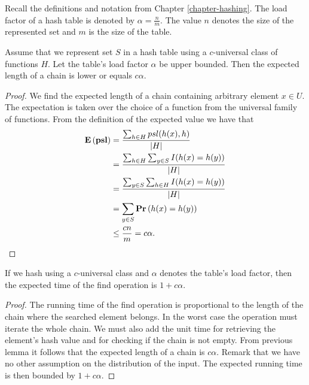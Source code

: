 Recall the definitions and notation from Chapter \ref{chapter-hashing}. The load factor of a hash table is denoted by $\alpha = \frac{n}{m}$. The value $n$ denotes the size of the represented set and $m$ is the size of the table.

\begin{theorem}
\label{theorem-expected-chain-length-universal}
Assume that we represent set $S$ in a hash table using a $c$-universal class of functions $H$. Let the table's load factor $\alpha$ be upper bounded. Then the expected length of a chain is lower or equals $c \alpha$.
\end{theorem}
\begin{proof}
We find the expected length of a chain containing arbitrary element $x \in U$. The expectation is taken over the choice of a function from the universal family of functions. From the definition of the expected value we have that
\begin{displaymath}
\begin{split}
\mathbf{E}\left(\mathbf{psl}\right) 
	& = \frac{\sum\displaylimits_{h \in H} psl(h(x), h) }{|H|} \\
	& = \frac{\sum\displaylimits_{h \in H} \sum\displaylimits_{y \in S} I(h(x) = h(y))}{|H|} \\
	& = \frac{\sum\displaylimits_{y \in S} \sum\displaylimits_{h \in H} I(h(x) = h(y))}{|H|}  \\
	& = \sum\displaylimits_{y \in S} \mathbf{Pr}\left(h(x) = h(y)\right) \\
	& \leq \frac{cn}{m} = c \alpha \text{.}
\end{split}
\end{displaymath}
\end{proof}

\begin{corollary}
If we hash using a $c$-universal class and $\alpha$ denotes the table's load factor, then the expected time of the find operation is $1 + c\alpha$.
\end{corollary}
\begin{proof}
The running time of the find operation is proportional to the length of the chain where the searched element belongs. In the worst case the operation must iterate the whole chain. We must also add the unit time for retrieving the element's hash value and for checking if the chain is not empty. From previous lemma it follows that the expected length of a chain is $c\alpha$. Remark that we have no other assumption on the distribution of the input. The expected running time is then bounded by $1 + c\alpha$. 
\end{proof}

